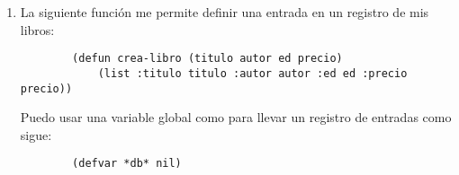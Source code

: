 \begin{enumerate}
\begin{solution}
        Ambas implementaciones se hicieron con la macro  para satisfacer los requerimientos del inciso 5 en conjunto de este. Ejemplos de las macros  y  se muestran a continuación:
        \begin{verbatim}
            * (myrepeat 3 (print 'hi))     

            HI 
            HI 
            HI 
            NIL
            * (myrepeat2 3 (print 'hi))

            HI 
            HI 
            HI 
            NIL
        \end{verbatim}
    \end{solution}
    \item La siguiente función me permite definir una entrada en un registro de mis libros:
    \begin{verbatim}
        (defun crea-libro (titulo autor ed precio)
            (list :titulo titulo :autor autor :ed ed :precio precio))
    \end{verbatim}
    Puedo usar  una variable global como  para llevar un registro de entradas como sigue:
    \begin{verbatim}
        (defvar *db* nil)


\end{verbatim}
\end{enumerate}
